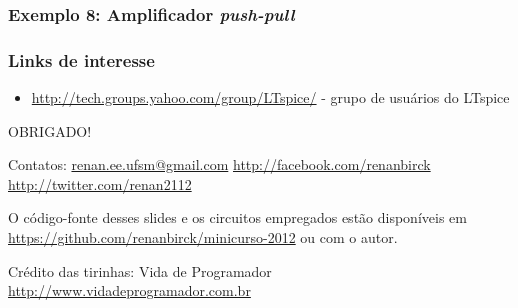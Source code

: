 \documentclass{beamer}
\begin{document}
\begin{frame}
\frametitle{Exemplo 8: Amplificador \textit{push-pull}}
\end{frame}

\begin{frame}
\frametitle{Links de interesse}
\begin{itemize}
\item \url{http://tech.groups.yahoo.com/group/LTspice/} - grupo de usuários do LTspice
\end{itemize}
\end{frame}

\begin{frame}
{\LARGE OBRIGADO!}
\end{frame}

\begin{frame}
Contatos: \url{renan.ee.ufsm@gmail.com} \url{http://facebook.com/renanbirck} \url{http://twitter.com/renan2112}\newline

O código-fonte desses slides e os circuitos empregados estão disponíveis em \url{https://github.com/renanbirck/minicurso-2012} ou com o autor.

Crédito das tirinhas: Vida de Programador \url{http://www.vidadeprogramador.com.br}
\end{frame}
\end{document}
